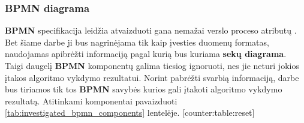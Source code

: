 \documentclass{VUMIFInfBakalaurinis}
\begin{document}
\subsubsection{BPMN diagrama}
\textbf{BPMN} specifikacija leidžia atvaizduoti gana nemažai verslo proceso atributų \cite{bpmnFormal}. Bet šiame darbe ji bus nagrinėjama tik kaip įvesties duomenų formatas, naudojamas apibrėžti informaciją pagal kurią bus kuriama \textbf{sekų diagrama}. Taigi daugelį \textbf{BPMN} komponentų galima tiesiog ignoruoti, nes jie neturi jokios įtakos algoritmo vykdymo rezultatui. Norint pabrėžti svarbią informaciją, darbe bus tiriamos tik tos \textbf{BPMN} savybės kurios gali įtakoti algoritmo vykdymo rezultatą. Atitinkami komponentai pavaizduoti \ref{tab:investigated_bpmn_components} lentelėje.
[counter:table:reset]
\newcommand\rownumber{\stepcounter{counter:table}\arabic{counter:table}}
\end{document}
